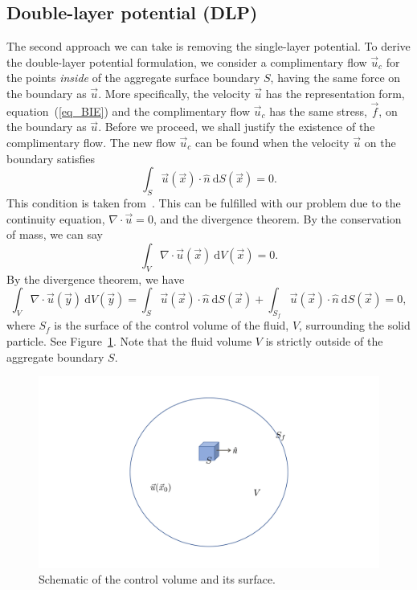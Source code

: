 \subsection{Double-layer potential (DLP)}
The second approach we can take is removing the single-layer potential. 
To derive the double-layer potential formulation, we consider a complimentary flow $\vec{u}_c$ 
for the points \textit{inside} of the aggregate surface boundary $S$, having the same force on the boundary as $\vec{u}$. More specifically, the velocity $\vec{u}$  has the representation form, equation~(\ref{eq_BIE}) and the complimentary flow $\vec{u}_c$ has the same stress, $\vec{f}$, on the boundary as $\vec{u}$. Before we proceed, we shall justify the existence of the complimentary flow.
The new flow $\vec{u}_c$ can be found when the velocity $\vec{u}$ on the boundary satisfies
\begin{equation}
 	\int_S \vec{u}(\vec{x}) \cdot \hat{n} \ \text{d}S(\vec{x})=0. 
	\label{eq_dlp_constraint}
\end{equation}
This condition is taken from~\cite{pozrikidis_boundary_1992}.
This can be fulfilled with our problem due to the continuity equation, $\nabla \cdot \vec{u}= 0$, and the divergence theorem.
By the conservation of mass, we can say
\begin{equation}
 	\int_V  \nabla \cdot \vec{u}(\vec{x}) \ \text{d}V (\vec{x}) 
		=0. 
	\label{eq_constraint_v}
\end{equation}
By the divergence theorem, we have
\begin{equation}
	\int_V  \nabla \cdot \vec{u}(\vec{y}) \ \text{d}V (\vec{y})   = 
\int_{S } \vec{u}(\vec{x}) \cdot \hat{n} \ \text{d}S(\vec{x})
+ \int_{S_f} \vec{u}(\vec{x}) \cdot \hat{n} \ \text{d}S(\vec{x})=0,
\label{eq_div}
\end{equation}
where $S_f$ is the surface of the control volume of the fluid, $V$, surrounding the solid particle. See Figure~\ref{fig_dlp_volume}.
Note that the fluid volume $V$ is strictly outside of the aggregate boundary $S$. 
\begin{figure}[h]
	\begin{center}
		\includegraphics[scale=0.2]{./figures/fig_dlp_volume}
		\vspace{0.5cm}
	\caption{Schematic of the control volume and its surface.}
	\label{fig_dlp_volume}
\end{center}
\end{figure}
